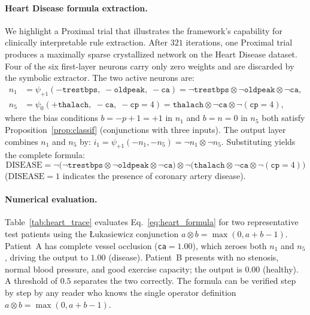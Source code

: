 \documentclass[10pt,a4paper,twoside]{article}
\newcommand{\tnorm}{\otimes}      %
\begin{document}
\paragraph{Heart Disease formula extraction.}
\label{ssec:heart}
We highlight a Proximal trial that illustrates the framework's capability for
clinically interpretable rule extraction.
After $321$ iterations, one Proximal trial produces a maximally sparse
crystallized network on the Heart Disease dataset.
Four of the six first-layer neurons carry only zero weights and are discarded
by the symbolic extractor.
The two active neurons are:
\begin{align}
  n_1 &= \psi_{+1}(-\mathtt{trestbps},\; -\mathtt{oldpeak},\; -\mathtt{ca})
       = \neg\mathtt{trestbps} \tnorm \neg\mathtt{oldpeak} \tnorm \neg\mathtt{ca},
       \label{eq:n1}\\
  n_5 &= \psi_{0}(+\mathtt{thalach},\; -\mathtt{ca},\; -\mathtt{cp}{=}4)
       = \mathtt{thalach} \tnorm \neg\mathtt{ca} \tnorm \neg(\mathtt{cp}{=}4),
       \label{eq:n5}
\end{align}
where the bias conditions $b = -p+1 = +1$ in $n_1$ and $b = n = 0$ in $n_5$
both satisfy Proposition~\ref{prop:classif} (conjunctions with three inputs).
The output layer combines $n_1$ and $n_5$ by:
$i_1 = \psi_{+1}(-n_1, -n_5) = \neg n_1 \tnorm \neg n_5$.
Substituting yields the complete formula:
\begin{equation}
  \boxed{
    \mathrm{DISEASE} =
    \neg\!\bigl(\neg\mathtt{trestbps} \tnorm \neg\mathtt{oldpeak}
                \tnorm \neg\mathtt{ca}\bigr)
    \tnorm
    \neg\!\bigl(\mathtt{thalach} \tnorm \neg\mathtt{ca}
                \tnorm \neg(\mathtt{cp}{=}4)\bigr)
  }
  \label{eq:heart_formula}
\end{equation}
($\mathrm{DISEASE} = 1$ indicates the presence of coronary artery disease).

\paragraph{Numerical evaluation.}
Table~\ref{tab:heart_trace} evaluates Eq.~\eqref{eq:heart_formula} for two
representative test patients using the \L{}ukasiewicz conjunction
$a \tnorm b = \max(0, a + b - 1)$.
Patient~A has complete vessel occlusion (\texttt{ca}$=1.00$), which zeroes
both $n_1$ and $n_5$, driving the output to $1.00$ (disease).
Patient~B presents with no stenosis, normal blood pressure, and good
exercise capacity; the output is $0.00$ (healthy).
A threshold of $0.5$ separates the two correctly.
The formula can be verified step by step by any reader who knows the single
operator definition $a \tnorm b = \max(0, a + b - 1)$.
\end{document}
